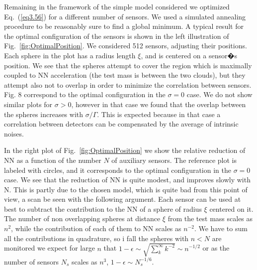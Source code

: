 Remaining in the framework of the simple model considered we optimized Eq.~(\ref{eq3.56}) for a different number of sensors. We used a simulated annealing procedure to be reasonably sure to find a global minimum. A typical result for the optimal configuration of the sensors is shown in the left illustration of Fig.~\ref{fig:OptimalPosition}. We considered 512 sensors, adjusting their positions. Each sphere in the plot has a radius length $\xi$, and is centered on a sensor�s position. We see that the spheres attempt to cover the region which is maximally coupled to NN acceleration (the test mass is between the two clouds), but they attempt also not to overlap in order to minimize the correlation between sensors. Fig. 8 correspond to the optimal configuration in the $\sigma= 0$ case. We do not show similar plots for $\sigma > 0$, however in that case we found that the overlap between the spheres increases with $\sigma/\Gamma$. This is expected because in that case a correlation between detectors can be compensated by the average of intrinsic noises. 

In the right plot of Fig.~\ref{fig:OptimalPosition} we show the relative reduction of NN as a function of the number $N$ of auxiliary sensors. The reference plot is labeled with circles, and it corresponds to the optimal configuration in the $\sigma= 0$ case. We see that the reduction of NN is quite modest, and improves slowly with N. This is partly due to the chosen model, which is quite bad from this point of view, a scan be seen with the following argument. Each sensor can be used at best to subtract the contribution to the NN of a sphere of radius $\xi$ centered on it. The number of non overlapping spheres at distance $\xi$ from the test mass scales as $n^2$, while the contribution of each of them to NN scales as $n^{-2}$. We have to sum all the contributions in quadrature, so i fall the spheres with $n<N$ are monitored we expect for large $n$ that $1-\epsilon\sim\sqrt{\sum^{\infty}_{k}k^{-2}}\sim n^{-1/2}$ or as the number of sensors $N_{s}$ scales as $n^{3}$, $1-\epsilon\sim N^{-1/6}_{s}$. 


